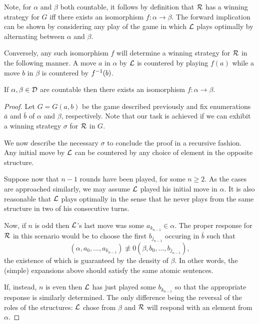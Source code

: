Note, for $\alpha$ and $\beta$ both countable, it follows by definition that
$\mathcal{R}$ has a winning strategy for $G$ iff there exists an isomorphism
$f\colon\alpha\to\beta$.  The forward implication can be shown by considering
any play of the game in which $\mathcal{L}$ plays optimally by alternating between
$\alpha$ and $\beta$.

Conversely, any such isomorphism $f$ will determine a winning strategy for
$\mathcal{R}$ in the following manner.  A move $a$ in $\alpha$ by $\mathcal{L}$ is
countered by playing $f(a)$ while a move $b$ in $\beta$ is countered by
${f}^{-1}(b)$.

\begin{thm}\label{thm:cantor} If $\alpha,\beta\in\mathcal{D}$ are
	countable then there exists an isomorphism $f\colon\alpha\to\beta$.
\end{thm}
\begin{proof} Let $G=G(a,b)$ be the game described previously and fix
	enumerations $\bar{a}$ and $\bar{b}$ of $\alpha$ and $\beta$, respectively.
	Note that our task is achieved if we can exhibit a winning strategy $\sigma$ for
	$\mathcal{R}$ in $G$.

	We now describe the necessary $\sigma$ to conclude the proof in a recursive
	fashion.  Any initial move by $\mathcal{L}$ can be countered by any choice of element
	in the opposite structure.

	Suppose now that $n-1$ rounds have been played, for some $n\geq 2$.  As the
	cases are approached similarly, we may assume $\mathcal{L}$ played his initial move in
	$\alpha$.  It is also reasonable that $\mathcal{L}$ plays optimally in the sense that
	he never plays from the same structure in two of his consecutive turns.

	Now, if $n$ is odd then $\mathcal{L}$'s last move was some $a_{k_{n-1}}\in\alpha$.
	The proper response for $\mathcal{R}$ in this scenario would be to choose the first
	$b_{j_{n-1}}$ occuring in $\bar{b}$ such that
	\begin{equation} (\alpha,a_{0},\dotsc,a_{k_{n-1}})\nequiv{0}(\beta,b_{0},\dotsc,b_{j_{n-1}}),
	\end{equation} the existence of which is guaranteed by the density of
	$\beta$.  In other words, the (simple) expansions above should satisfy the same
	atomic sentences.

	If, instead, $n$ is even then $\mathcal{L}$ has just played some $b_{k_{n-1}}$ so
	that the appropriate response is similarly determined.  The only difference
	being the reversal of the roles of the structures: $\mathcal{L}$ chose from $\beta$
	and $\mathcal{R}$ will respond with an element from $\alpha$.
\end{proof}

